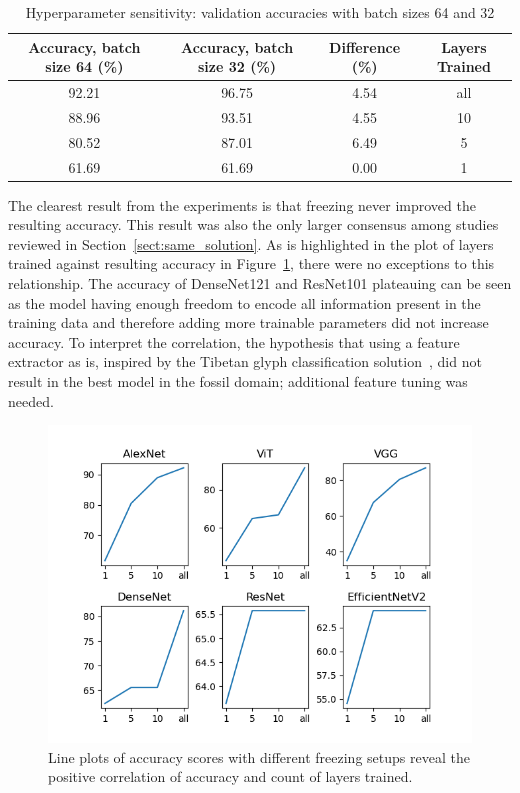 \documentclass[english,twoside,openright]{UH_DS_MSc}
\begin{document}
\begin{table}[ht]
    \centering
        \scriptsize
        \begin{tabular}{|c|c|c|c|}
            \hline
            \textbf{Accuracy, batch size 64 (\%)} & \textbf{Accuracy, batch size 32 (\%)} & \textbf{Difference} (\%) & \textbf{Layers Trained} \\ \hline
            92.21 & 96.75 & 4.54 & all \\\hline
            88.96 & 93.51 & 4.55 & 10  \\\hline
            80.52 & 87.01 & 6.49 & 5   \\\hline
            61.69 & 61.69 & 0.00 & 1   \\\hline
        \end{tabular}
    \caption{Hyperparameter sensitivity: validation accuracies with batch sizes 64 and 32}
    \label{table:hyperparameter_sensitivity}
\end{table}

The clearest result from the experiments is that freezing never improved the resulting accuracy. This result was 
also the only larger consensus among studies reviewed in Section~\ref{sect:same_solution}.
As is highlighted in the plot of layers trained against resulting accuracy in Figure~\ref{image:accuracy_vs_freezing},
there were no exceptions to this relationship. The accuracy of DenseNet121 and ResNet101 plateauing can be seen as 
the model having enough freedom to encode all information present in the training data and therefore adding 
more trainable parameters did not increase accuracy. To interpret the correlation, the hypothesis that using a feature 
extractor as is, inspired by the Tibetan glyph classification solution~\cite{4zhaoTibetan}, did not result in the 
best model in the fossil domain; additional feature tuning was needed.

\begin{figure}[ht]
    \centering
    \includegraphics*[scale=0.8]{images/accuracy_against_freezing.png}
    \caption{Line plots of accuracy scores with different freezing setups reveal the positive correlation of accuracy and count of layers trained.}
    \label{image:accuracy_vs_freezing}
\end{figure}
\end{document}

